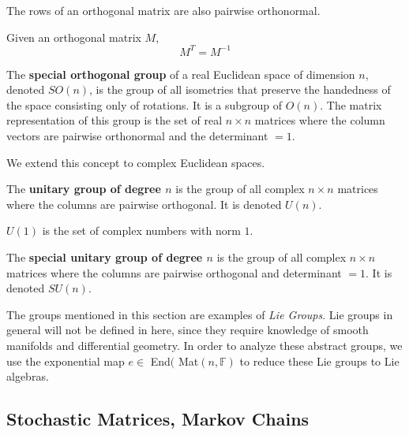   \begin{theorem}
    The rows of an orthogonal matrix are also pairwise orthonormal.
  \end{theorem}

  \begin{theorem}
    Given an orthogonal matrix $M$,
    \begin{equation}
      M^T = M^{-1}
    \end{equation}
  \end{theorem}

  \begin{definition}
    The \textbf{special orthogonal group} of a real Euclidean space of dimension $n$, denoted $SO(n)$, is the group of all isometries that preserve the handedness of the space consisting only of rotations. It is a subgroup of $O(n)$. The matrix representation of this group is the set of real $n \times n$ matrices where the column vectors are pairwise orthonormal and the determinant $=1$. 
  \end{definition}

  We extend this concept to complex Euclidean spaces. 

  \begin{definition}
    The \textbf{unitary group of degree $n$} is the group of all complex $n \times n$ matrices where the columns are pairwise orthogonal. It is denoted $U(n)$. 
  \end{definition}

  \begin{example}
    $U(1)$ is the set of complex numbers with norm $1$. 
  \end{example}

  \begin{definition}
    The \textbf{special unitary group of degree $n$} is the group of all complex $n \times n$ matrices where the columns are pairwise orthogonal and determinant $=1$. It is denoted $SU(n)$. 
  \end{definition}

  The groups mentioned in this section are examples of \textit{Lie Groups}. Lie groups in general will not be defined in here, since they require knowledge of smooth manifolds and differential geometry. In order to analyze these abstract groups, we use the exponential map $e \in$ End$($ Mat$(n, \mathbb{F})$ to reduce these Lie groups to Lie algebras.

\subsection{Stochastic Matrices, Markov Chains}


